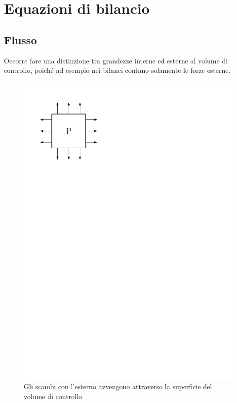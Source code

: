 %
\section{Equazioni di bilancio}
%
\subsection{Flusso}
Occorre fare una distinzione tra grandezze interne ed esterne al volume di controllo, poiché ad esempio nei bilanci contano solamente le forze esterne.
%
	\begin{figure}[ht]
		\includegraphics[scale=0.6]{./1.4 Equazioni di bilancio/1.4-1}
		\centering
		\caption{Gli scambi con l'esterno avvengono attraverso la superficie del volume di controllo}
	\end{figure}

